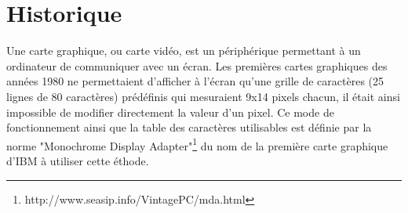 \section{Historique}

Une carte graphique, ou carte vidéo, est un périphérique permettant à un ordinateur de communiquer 
avec un écran.
Les premières cartes graphiques des années 1980 ne permettaient d'afficher à l'écran qu'une grille de caractères (25 lignes de 80 caractères)
prédéfinis qui mesuraient 9x14 pixels chacun, il était ainsi impossible de modifier directement la valeur d'un pixel.
Ce mode de fonctionnement ainsi que la table des caractères utilisables est définie par la norme "Monochrome Display Adapter"\footnote{http://www.seasip.info/VintagePC/mda.html}
du nom de la première carte graphique d'IBM à utiliser cette éthode.

